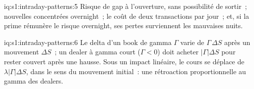 \begin{solution}{iq:s1:intraday-patterns:5}
Risque de gap à l'ouverture, sans possibilité de sortir~; nouvelles concentrées overnight~; le coût de deux transactions par jour~; et, si la prime rémunère
le risque overnight, ses pertes surviennent les mauvaises nuits.
\end{solution}

\begin{solution}{iq:s1:intraday-patterns:6}
Le delta d'un book de gamma $\Gamma$ varie de $\Gamma\,\Delta S$ après un mouvement $\Delta S$~; un dealer à gamma court ($\Gamma < 0$) doit acheter $|\Gamma|\Delta S$ pour rester
couvert après une hausse. Sous un impact linéaire, le cours se déplace de $\lambda |\Gamma| \Delta S$, dans le sens du mouvement initial~: une rétroaction proportionnelle au
gamma des dealers.
\end{solution}
